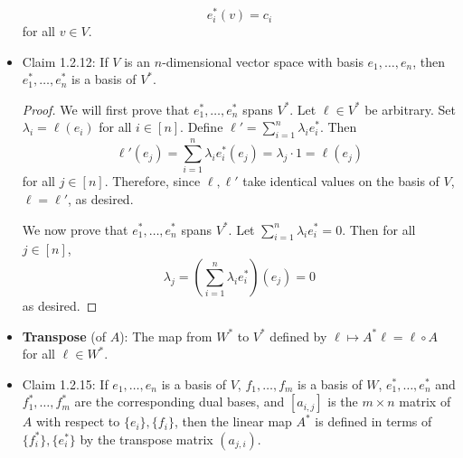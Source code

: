 \documentclass[../notes.tex]{subfiles}
\begin{document}
\begin{itemize}
    \begin{equation*}
        e_i^*(v) = c_i
    \end{equation*}
    for all $v\in V$.
    \item Claim 1.2.12: If $V$ is an $n$-dimensional vector space with basis $e_1,\dots,e_n$, then $e_1^*,\dots,e_n^*$ is a basis of $V^*$.
    \begin{proof}
        We will first prove that $e_1^*,\dots,e_n^*$ spans $V^*$. Let $\ell\in V^*$ be arbitrary. Set $\lambda_i=\ell(e_i)$ for all $i\in[n]$. Define $\ell'=\sum_{i=1}^n\lambda_ie_i^*$. Then
        \begin{equation*}
            \ell'(e_j) = \sum_{i=1}^n\lambda_ie_i^*(e_j)
            = \lambda_j\cdot 1
            = \ell(e_j)
        \end{equation*}
        for all $j\in[n]$. Therefore, since $\ell,\ell'$ take identical values on the basis of $V$, $\ell=\ell'$, as desired.\par
        We now prove that $e_1^*,\dots,e_n^*$ spans $V^*$. Let $\sum_{i=1}^n\lambda_ie_i^*=0$. Then for all $j\in[n]$,
        \begin{equation*}
            \lambda_j = \left( \sum_{i=1}^n\lambda_ie_i^* \right)(e_j)
            = 0
        \end{equation*}
        as desired.
    \end{proof}
    \item \textbf{Transpose} (of $A$): The map from $W^*$ to $V^*$ defined by $\ell\mapsto A^*\ell=\ell\circ A$ for all $\ell\in W^*$.
    \item Claim 1.2.15: If $e_1,\dots,e_n$ is a basis of $V$, $f_1,\dots,f_m$ is a basis of $W$, $e_1^*,\dots,e_n^*$ and $f_1^*,\dots,f_m^*$ are the corresponding dual bases, and $[a_{i,j}]$ is the $m\times n$ matrix of $A$ with respect to $\{e_i\},\{f_i\}$, then the linear map $A^*$ is defined in terms of $\{f_i^*\},\{e_i^*\}$ by the transpose matrix $(a_{j,i})$.
\end{itemize}
\end{document}
